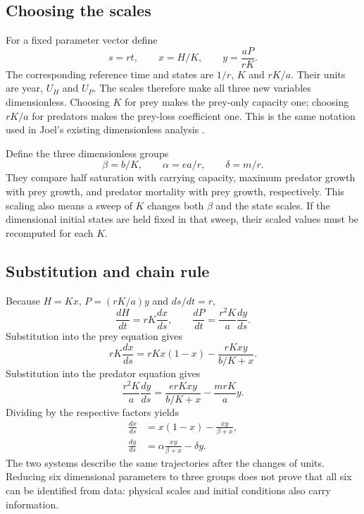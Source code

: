 \subsection{Choosing the scales}
For a fixed parameter vector define
\begin{equation}\label{eq:arnav_scales}
s=rt,\qquad x=H/K,\qquad y=\frac{aP}{rK}.
\end{equation}
The corresponding reference time and states are $1/r$, $K$ and $rK/a$.
Their units are year, $U_H$ and $U_P$. The scales therefore make all three new
variables dimensionless. Choosing $K$ for prey makes the prey-only capacity one;
choosing $rK/a$ for predators makes the prey-loss coefficient one. This is the
same notation used in Joel's existing dimensionless analysis
\cite{arnav_joel2026}.

Define the three dimensionless groups
\begin{equation}\label{eq:arnav_groups}
\beta=b/K,\qquad \alpha=ea/r,\qquad \delta=m/r.
\end{equation}
They compare half saturation with carrying capacity, maximum predator growth with
prey growth, and predator mortality with prey growth, respectively. This scaling
also means a sweep of $K$ changes both $\beta$ and the state scales. If the
dimensional initial states are held fixed in that sweep, their scaled values must
be recomputed for each $K$.

\subsection{Substitution and chain rule}
Because $H=Kx$, $P=(rK/a)y$ and $ds/dt=r$,
\begin{equation}
\frac{dH}{dt}=rK\frac{dx}{ds},\qquad
\frac{dP}{dt}=\frac{r^2K}{a}\frac{dy}{ds}.
\end{equation}
Substitution into the prey equation gives
\begin{equation}
rK\frac{dx}{ds}=rKx(1-x)-\frac{rKxy}{b/K+x}.
\end{equation}
Substitution into the predator equation gives
\begin{equation}
\frac{r^2K}{a}\frac{dy}{ds}
=\frac{erKxy}{b/K+x}-\frac{mrK}{a}y.
\end{equation}
Dividing by the respective factors yields
\begin{align}
\frac{dx}{ds}&=x(1-x)-\frac{xy}{\beta+x},\label{eq:arnav_x}\\
\frac{dy}{ds}&=\alpha\frac{xy}{\beta+x}-\delta y.\label{eq:arnav_y}
\end{align}
The two systems describe the same trajectories after the changes of units. Reducing
six dimensional parameters to three groups does not prove that all six can be
identified from data: physical scales and initial conditions also carry information.

